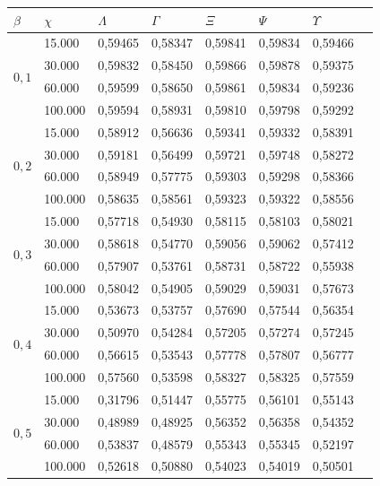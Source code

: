 \begin{table}[!ht]
\begin{center}
\begin{tabular}{|l|l|l|l|l|l|l|l|} %
\hline
$\beta$ & $\chi$ & $\Lambda$ & $\Gamma$ & $\Xi$ & $\Psi$ & $\Upsilon$ \\
\hline %
\multirow{4}{*}{$0,1$}
& 15.000 & 0,59465 & 0,58347 & 0,59841 & 0,59834 & 0,59466 \\
& 30.000 & 0,59832 & 0,58450 & 0,59866 & 0,59878 & 0,59375 \\
& 60.000 & 0,59599 & 0,58650 & 0,59861 & 0,59834 & 0,59236 \\
& 100.000 & 0,59594 & 0,58931 & 0,59810 & 0,59798 & 0,59292 \\
\hline %
\multirow{4}{*}{$0,2$}
& 15.000 & 0,58912 & 0,56636 & 0,59341 & 0,59332 & 0,58391 \\
& 30.000 & 0,59181 & 0,56499 & 0,59721 & 0,59748 & 0,58272 \\
& 60.000 & 0,58949 & 0,57775 & 0,59303 & 0,59298 & 0,58366 \\
& 100.000 & 0,58635 & 0,58561 & 0,59323 & 0,59322 & 0,58556 \\
\hline %
\multirow{4}{*}{$0,3$}
& 15.000 & 0,57718 & 0,54930 & 0,58115 & 0,58103 & 0,58021 \\
& 30.000 & 0,58618 & 0,54770 & 0,59056 & 0,59062 & 0,57412 \\
& 60.000 & 0,57907 & 0,53761 & 0,58731 & 0,58722 & 0,55938 \\
& 100.000 & 0,58042 & 0,54905 & 0,59029 & 0,59031 & 0,57673 \\
\hline %
\multirow{4}{*}{$0,4$}
& 15.000 & 0,53673 & 0,53757 & 0,57690 & 0,57544 & 0,56354 \\
& 30.000 & 0,50970 & 0,54284 & 0,57205 & 0,57274 & 0,57245 \\
& 60.000 & 0,56615 & 0,53543 & 0,57778 & 0,57807 & 0,56777 \\
& 100.000 & 0,57560 & 0,53598 & 0,58327 & 0,58325 & 0,57559 \\
\hline %
\multirow{4}{*}{$0,5$}
& 15.000 & 0,31796 & 0,51447 & 0,55775 & 0,56101 & 0,55143 \\
& 30.000 & 0,48989 & 0,48925 & 0,56352 & 0,56358 & 0,54352 \\
& 60.000 & 0,53837 & 0,48579 & 0,55343 & 0,55345 & 0,52197 \\
& 100.000 & 0,52618 & 0,50880 & 0,54023 & 0,54019 & 0,50501 \\

\end{tabular}
\end{center}
\end{table}
